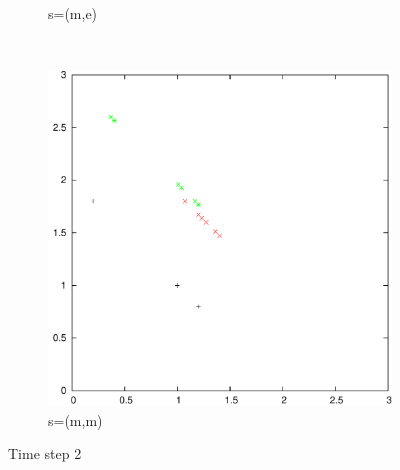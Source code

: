 \documentclass{article}
\begin{document}
\begin{figure}
\begin{subfigure}[b]{0.3\textwidth}
			\caption{s=(m,e)}
			\label{fig:t2s1}
		\end{subfigure}
		~
		\begin{subfigure}[b]{0.3\textwidth}
			\centering
			\includegraphics[width=\textwidth]{images/t2s3}
			\caption{s=(m,m)}
			\label{fig:t2s3}
		\end{subfigure}
		\caption{Time step 2}
	\end{figure}
\end{document}
